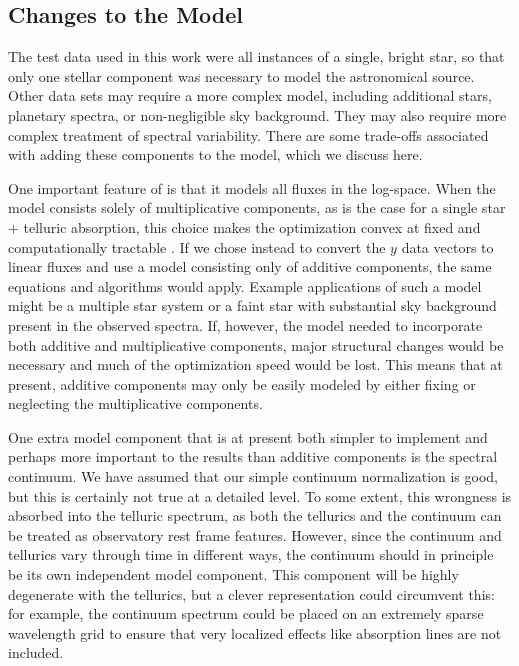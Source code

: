 \documentclass[modern]{aastex62}
\begin{document}
\subsection{Changes to the Model}
\label{s:model-changes}

The test data used in this work were all instances of a single, bright star, so that only one stellar component was necessary to model the astronomical source.
Other data sets may require a more complex model, including additional stars, planetary spectra, or non-negligible sky background.
They may also require more complex treatment of spectral variability.
There are some trade-offs associated with adding these components to the model, which we discuss here.

One important feature of \wobble is that it models all fluxes in the log-space.
When the model consists solely of multiplicative components, as is the case for a single star + telluric absorption, this choice makes the optimization convex at fixed \RV and computationally tractable .
If we chose instead to convert the $y$ data vectors to linear fluxes and use a model consisting only of additive components, the same equations and algorithms would apply.
Example applications of such a model might be a multiple star system or a faint star with substantial sky background present in the observed spectra.
If, however, the model needed to incorporate both additive and multiplicative components, major structural changes would be necessary and much of the optimization speed would be lost.
This means that at present, additive components may only be easily modeled by either fixing or neglecting the multiplicative components.

One extra model component that is at present both simpler to implement and perhaps more important to the results than additive components is the spectral continuum.
We have assumed that our simple continuum normalization is good, but this is certainly not true at a detailed level.
To some extent, this wrongness is absorbed into the telluric spectrum, as both the tellurics and the continuum can be treated as observatory rest frame features.
However, since the continuum and tellurics vary through time in different ways, the continuum should in principle be its own independent model component.
This component will be highly degenerate with the tellurics, but a clever representation could circumvent this: for example, the continuum spectrum could be placed on an extremely sparse wavelength grid to ensure that very localized effects like absorption lines are not included.
\end{document}
